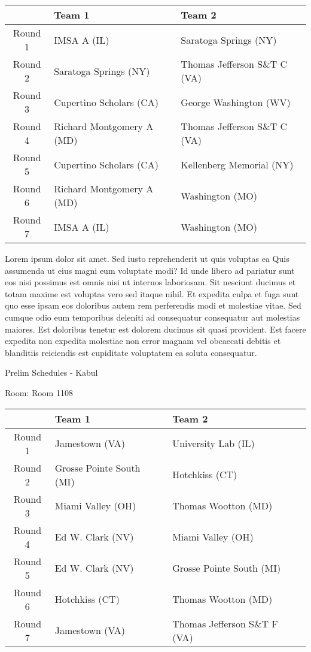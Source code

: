 \documentclass{article}%
\begin{document}
\begin{tabularx}{\textwidth}{|c|Y|Y|}%
\hline%
&Team 1&Team 2\\%
\hline%
Round 1&IMSA A (IL)&Saratoga Springs (NY)\\%
Round 2&Saratoga Springs (NY)&Thomas Jefferson S\&T C (VA)\\%
Round 3&Cupertino Scholars (CA)&George Washington (WV)\\%
Round 4&Richard Montgomery A (MD)&Thomas Jefferson S\&T C (VA)\\%
Round 5&Cupertino Scholars (CA)&Kellenberg Memorial (NY)\\%
Round 6&Richard Montgomery A (MD)&Washington (MO)\\%
Round 7&IMSA A (IL)&Washington (MO)\\%
\hline%
\end{tabularx}%
\vspace*{8pt}%
\linebreak%
\newline%
Lorem ipsum dolor sit amet. Sed iusto reprehenderit ut quis voluptas ea Quis assumenda ut eius magni eum voluptate modi? Id unde libero ad pariatur sunt eos nisi possimus est omnis nisi ut internos laboriosam. Sit nesciunt ducimus et totam maxime est voluptas vero sed itaque nihil. Et expedita culpa et fuga sunt quo esse ipsam eos doloribus autem rem perferendis modi et molestiae vitae.\newline%
\newline%
Sed cumque odio eum temporibus deleniti ad consequatur consequatur aut molestias maiores. Est doloribus tenetur est dolorem ducimus sit quasi provident. Est facere expedita non expedita molestiae non error magnam vel obcaecati debitis et blanditiis reiciendis est cupiditate voluptatem ea soluta consequatur.%
\newpage%
\begin{center}%
\begin{Huge}%
Prelim Schedules {-} Kabul%
\end{Huge}%
\end{center}%
\begin{flushleft}%
\begin{Large}%
Room: Room 1108%
\end{Large}%
\end{flushleft}%
\begin{tabularx}{\textwidth}{|c|Y|Y|}%
\hline%
&Team 1&Team 2\\%
\hline%
Round 1&Jamestown (VA)&University Lab (IL)\\%
Round 2&Grosse Pointe South (MI)&Hotchkiss (CT)\\%
Round 3&Miami Valley (OH)&Thomas Wootton (MD)\\%
Round 4&Ed W. Clark (NV)&Miami Valley (OH)\\%
Round 5&Ed W. Clark (NV)&Grosse Pointe South (MI)\\%
Round 6&Hotchkiss (CT)&Thomas Wootton (MD)\\%
Round 7&Jamestown (VA)&Thomas Jefferson S\&T F (VA)\\%
\hline%
\end{tabularx}%
\end{document}
